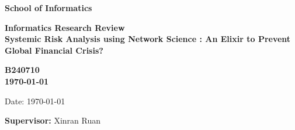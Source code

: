 \documentclass[a4paper,11pt]{article}
\newcommand{\examnumber}{B240710}
\newcommand{\field}{Systemic Risk Analysis using Network Science : An Elixir to Prevent Global Financial Crisis?}
\newcommand{\supervisor}{Xinran Ruan}
\begin{document}
\begin{minipage}[b]{110mm}
        {\Huge\bf School of Informatics
        \vspace*{17mm}}
\end{minipage}
\hfill
\begin{minipage}[t]{40mm}               
\end{minipage}
\par\noindent
\vspace*{2cm}
\begin{center}
        \Large\bf Informatics Research Review \\
        \Large\bf \field
\end{center}
\vspace*{1.5cm}
\begin{center}
        \bf \examnumber\\
        \monthyeardate\today
\end{center}
\vspace*{5mm}

%
%                       
\begin{abstract}
The emerging global financial system marked a new era where institutions, markets, and players are interconnected and depending on each other. Although it boosts global economic progress, it is exposed to systemic risk due to its properties. Network science appears as one of promising approaches to manage such risk because of its properties that resemble real-world systems and abilities to uncover covert insights from it. In this review, we explore the multiple approaches of combination of network science and financial model in order to do systemic risk analysis in global stock indexes and banking systems during the 2020 covid recession and 2007 great recession.
\end{abstract}

\vspace*{1cm}

\vspace*{3cm}
Date: \today

\vfill
{\bf Supervisor:} \supervisor
\newpage

\setcounter{page}{1}                            %
\footruleheight{1pt}
\headruleheight{1pt}
\rhead{- \thepage}
\cfoot{}
%
\end{document}
